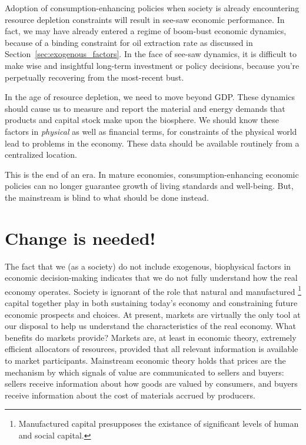 Adoption of consumption-enhancing policies when society is already encountering
resource depletion constraints
will result in see-saw economic performance. 
In fact, we may have already entered a regime of boom-bust economic dynamics,
because of a binding constraint for oil extraction rate
as discussed in Section~\ref{sec:exogenous_factors}.
In the face of see-saw dynamics,
it is difficult to make wise and insightful long-term investment or policy decisions,
because you're perpetually recovering from the most-recent bust.

In the age of resource depletion, 
we need to move beyond GDP.
These dynamics should cause us to measure and report
the material and energy demands that products and capital stock 
make upon the biosphere.
We should know these factors 
in \emph{physical} as well as financial terms,
for constraints of the physical world 
lead to problems in the economy.
These data should be available routinely from a centralized location.

This is the end of an era.
In mature economies, consumption-enhancing 
economic policies can no longer guarantee 
growth of living standards and well-being.
But, the mainstream is blind to what should be done instead. 


\section{Change is needed!}
\label{sec:change_needed}

The fact that we (as a society) do not include exogenous, biophysical factors 
in economic decision-making indicates that
we do not fully understand how the real economy operates.
Society is ignorant of the role that natural and manufactured%
	\footnote{
	Manufactured capital presupposes the existance of 
	significant levels of human and social capital.
	}
capital together play in both sustaining today's economy and 
constraining future economic prospects and choices.
At present, markets are virtually the only tool at our disposal
to help us understand the characteristics of the real economy.
What benefits do markets provide?
Markets are, at least in economic theory, extremely efficient allocators of resources,
provided that all relevant information is available to market participants.
Mainstream economic theory holds that prices are the mechanism by which signals
of value are communicated to sellers and buyers:
sellers receive information about how goods are valued by consumers, and
buyers receive information about the cost of materials accrued by producers.

